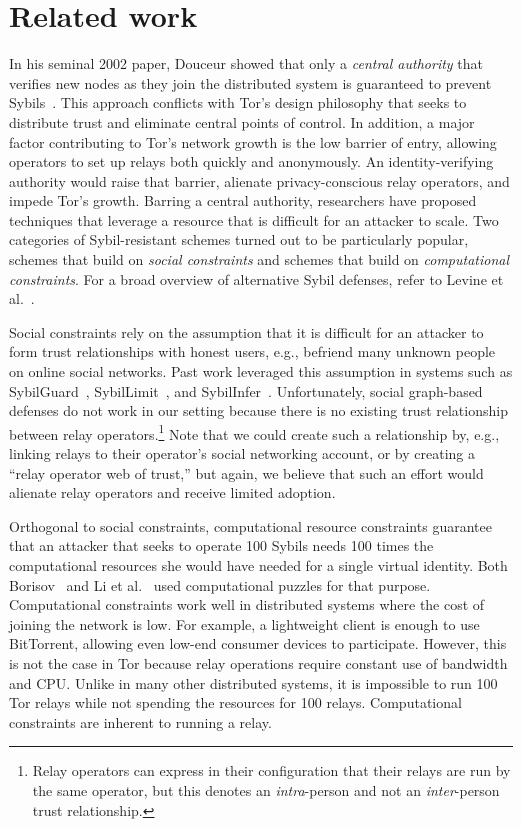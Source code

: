 \section{Related work}
\label{sec:related_work}
In his seminal 2002 paper, Douceur showed that only a \emph{central authority}
that verifies new nodes as they join the distributed system is guaranteed to
prevent Sybils~\cite{Douceur2002a}.  This approach conflicts with Tor's design
philosophy that seeks to distribute trust and eliminate central points of
control.  In addition, a major factor contributing to Tor's network growth is
the low barrier of entry, allowing operators to set up relays both quickly and
anonymously.  An identity-verifying authority would raise that barrier, alienate
privacy-conscious relay operators, and impede Tor's growth.  Barring a central
authority, researchers have proposed techniques that leverage a resource that is
difficult for an attacker to scale.  Two categories of Sybil-resistant schemes
turned out to be particularly popular, schemes that build on \emph{social
constraints} and schemes that build on \emph{computational constraints}.  For a
broad overview of alternative Sybil defenses, refer to Levine et
al.~\cite{Levine2006a}.

Social constraints rely on the assumption that it is difficult for an attacker
to form trust relationships with honest users, e.g., befriend many unknown
people on online social networks.  Past work leveraged this assumption in
systems such as SybilGuard~\cite{Yu2006a}, SybilLimit~\cite{Yu2008a}, and
SybilInfer~\cite{Danezis2009a}.  Unfortunately, social graph-based defenses
do not work in our setting because there is no existing trust relationship
between relay operators.\footnote{Relay operators can express in their
configuration that their relays are run by the same operator, but this
denotes an \emph{intra}-person and not an \emph{inter}-person trust
relationship.} Note that we could create such a relationship by, e.g., linking
relays to their operator's social networking account, or by creating a ``relay
operator web of trust,'' but again, we believe that such an effort would
alienate relay operators and receive limited adoption.

Orthogonal to social constraints, computational resource constraints guarantee
that an attacker that seeks to operate 100 Sybils needs 100 times the
computational resources she would have needed for a single virtual identity.
Both Borisov~\cite{Borisov2006a} and Li et al.~\cite{Li2012a} used computational
puzzles for that purpose.  Computational constraints work well in distributed
systems where the cost of joining the network is low.  For example, a
lightweight client is enough to use BitTorrent, allowing even low-end consumer
devices to participate.  However, this is not the case in Tor because relay
operations require constant use of bandwidth and CPU.  Unlike in many other
distributed systems, it is impossible to run 100 Tor relays while not spending
the resources for 100 relays.  Computational constraints are inherent to running
a relay.

